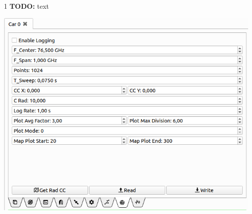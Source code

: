 \documentclass[12pt]{article} %
\def\printtodos{0}
\newcommand{\todo}[1]{
  \if\printtodos1
      {\color{red} \textbf{TODO:} #1}
  \fi}
\begin{document}
\noindent\begin{minipage}{0.5\textwidth} %
  \todo{text}
\end{minipage}
\begin{minipage}{0.5\textwidth}
  \noindent \includegraphics[width=\textwidth]{./screens/Car_radar.png}    
\end{minipage}
\end{document}
